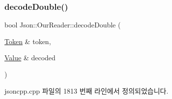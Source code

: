 \subsubsection{\texorpdfstring{decode\+Double()}{decodeDouble()}\hspace{0.1cm}{\footnotesize\ttfamily [2/2]}}
{\footnotesize\ttfamily bool Json\+::\+Our\+Reader\+::decode\+Double (\begin{DoxyParamCaption}\item[{\hyperlink{class_json_1_1_our_reader_1_1_token}{Token} \&}]{token,  }\item[{\hyperlink{class_json_1_1_value}{Value} \&}]{decoded }\end{DoxyParamCaption})\hspace{0.3cm}{\ttfamily [private]}}



jsoncpp.\+cpp 파일의 1813 번째 라인에서 정의되었습니다.


